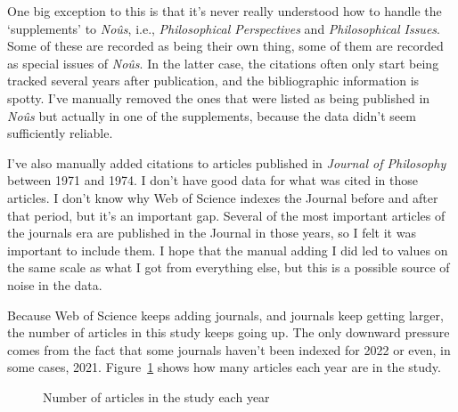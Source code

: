 \documentclass[
  10pt,
  letterpaper,
  DIV=11,
  numbers=noendperiod,
  twoside]{scrartcl}
\begin{document}
One big exception to this is that it's never really understood how to
handle the `supplements' to \emph{Noûs}, i.e., \emph{Philosophical
Perspectives} and \emph{Philosophical Issues}. Some of these are
recorded as being their own thing, some of them are recorded as special
issues of \emph{Noûs}. In the latter case, the citations often only
start being tracked several years after publication, and the
bibliographic information is spotty. I've manually removed the ones that
were listed as being published in \emph{Noûs} but actually in one of the
supplements, because the data didn't seem sufficiently reliable.

I've also manually added citations to articles published in
\emph{Journal of Philosophy} between 1971 and 1974. I don't have good
data for what was cited in those articles. I don't know why Web of
Science indexes the Journal before and after that period, but it's an
important gap. Several of the most important articles of the journals
era are published in the Journal in those years, so I felt it was
important to include them. I hope that the manual adding I did led to
values on the same scale as what I got from everything else, but this is
a possible source of noise in the data.

Because Web of Science keeps adding journals, and journals keep getting
larger, the number of articles in this study keeps going up. The only
downward pressure comes from the fact that some journals haven't been
indexed for 2022 or even, in some cases, 2021.
Figure~\ref{fig-number-of-articles-by-year} shows how many articles each
year are in the study.

\begin{figure}


\caption{\label{fig-number-of-articles-by-year}Number of articles in the
study each year}

\end{figure}%
\end{document}

